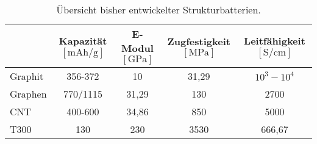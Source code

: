 \begin{table}[ht]
    \centering
    \caption{Übersicht bisher entwickelter Strukturbatterien.}
    \begin{tabular}[t]{lcccc}
    \toprule
    &\makecell{Kapazität\\$\left[ \si{\mA \hour \per \g} \right]$} %
    &\makecell{E-Modul\\ $\left[ \si{\GPa} \right]$}
    &\makecell{Zugfestigkeit\\ $\left[ \si{\MPa} \right]$}
    &\makecell{Leitfähigkeit\\ $\left[ \si{\siemens \per \cm} \right]$}
    \\
    \midrule
    Graphit
        &356-372 \cite{Winter1998} %
        &10 \cite{Lin2023} %
        &31,29 \cite{Lin2023} %
        &$10^3-10^4$ \cite{Wang2021} %
        \\
    Graphen
        &770/1115 \cite{Wu2011} %
        &31,29 \cite{Lin2023}  %
        &130 \cite{Lin2023} %
        &2700 \cite{Murata2019} %
        \\
    CNT
        &400-600 \cite{Boaretto2020}
        &34,86 \cite{Kim2017}
        &850 \cite{Kim2017}
        &5000 \cite{Charlier2007}
        \\
    T300
        &130 \cite{Kjell2011}
        &230 \cite{Kjell2011}
        &3530 \cite{Kjell2011}
        &666,67\cite{Kjell2011}

\end{tabular}
\end{table}
